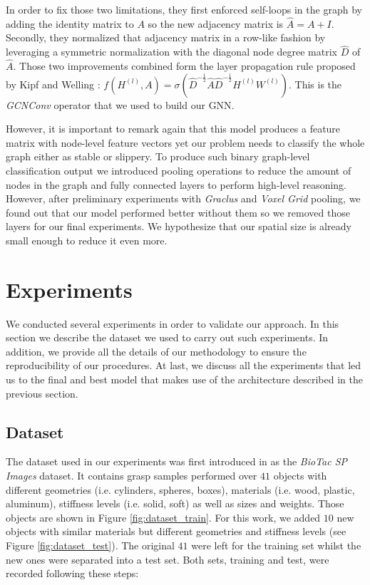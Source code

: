 In order to fix those two limitations, they first enforced self-loops in the graph by adding the identity matrix to $A$ so the new adjacency matrix is $\hat{A} = A + I$. Secondly, they normalized that adjacency matrix in a row-like fashion by leveraging a symmetric normalization with the diagonal node degree matrix $\hat{D}$ of $\hat{A}$. Those two improvements combined form the layer propagation rule proposed by Kipf and Welling \cite{Kipf2016}: $f(H^{(l)}, A) = \sigma(\hat{D}^{-\frac{1}{2}}\hat{A}\hat{D}^{-\frac{1}{2}}H^{(l)}W^{(l)})$. This is the \emph{GCNConv} operator that we used to build our \ac{GNN}.

However, it is important to remark again that this model produces a feature matrix with node-level feature vectors yet our problem needs to classify the whole graph either as stable or slippery. To produce such binary graph-level classification output we introduced pooling operations to reduce the amount of nodes in the graph and fully connected layers to perform high-level reasoning. However, after preliminary experiments with \emph{Graclus} \cite{Dhillon2007} and \emph{Voxel Grid} \cite{Simonovsky2017} pooling, we found out that our model performed better without them so we removed those layers for our final experiments. We hypothesize that our spatial size is already small enough to reduce it even more.

\section{Experiments}
\label{cha:tactile:sec:experiments}

We conducted several experiments in order to validate our approach. In this section we describe the dataset we used to carry out such experiments. In addition, we provide all the details of our methodology to ensure the reproducibility of our procedures. At last, we discuss all the experiments that led us to the final and best model that makes use of the architecture described in the previous section.

\subsection{Dataset}
\label{cha:tactile:sec:experiments:subsec:dataset}

The dataset used in our experiments was first introduced in \cite{Zapata2018} as the \emph{BioTac SP Images} dataset. It contains grasp samples performed over $41$ objects with different geometries (i.e. cylinders, spheres, boxes), materials (i.e. wood, plastic, aluminum), stiffness levels (i.e. solid, soft) as well as sizes and weights. Those objects are shown in Figure \ref{fig:dataset_train}. For this work, we added $10$ new objects with similar materials but different geometries and stiffness levels (see Figure \ref{fig:dataset_test}). The original $41$ were left for the training set whilst the new ones were separated into a test set. Both sets, training and test, were recorded following these steps:

